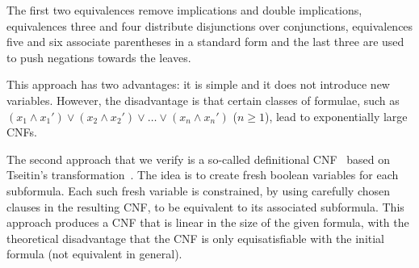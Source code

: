 The first two equivalences remove implications and double
implications, equivalences three and four distribute disjunctions over
conjunctions, equivalences five and six associate parentheses in a
standard form and the last three are used to push negations towards
the leaves.

This approach has two advantages: it is simple and it does not
introduce new variables. However, the disadvantage is that certain
classes of formulae, such as
$ (x_1 \land x_1') \lor (x_2 \land x_2') \lor \ldots \lor (x_n \land
x_n')$ (\(n \geq 1 \)), lead to exponentially large CNFs.



The second approach that we verify is a so-called definitional
CNF~\cite{harrison} based on Tseitin's transformation~\cite{man}. The idea is to
create fresh boolean variables for each subformula. Each such fresh
variable is constrained, by using carefully chosen clauses in the
resulting CNF, to be equivalent to its associated subformula. This
approach produces a CNF that is linear in the size of the given
formula, with the theoretical disadvantage that the CNF is only
equisatisfiable with the initial formula (not equivalent in general).



